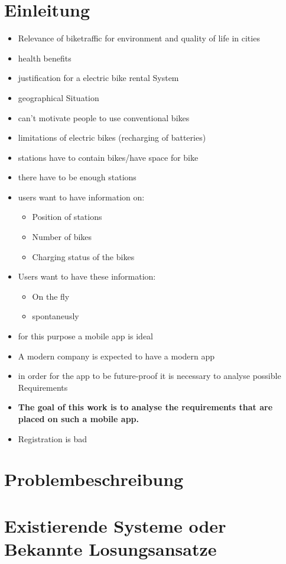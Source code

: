 \documentclass{article}
\begin{document}
\section{Einleitung}
\begin{itemize}
    \item Relevance of biketraffic for environment and quality of life in cities
    \item health benefits
    \item justification for a electric bike rental System
    \item geographical Situation
    \item can't motivate people to use conventional bikes
    \item limitations of electric bikes (recharging of batteries)
    \item stations have to contain bikes/have space for bike
    \item there have to be enough stations
    \item users want to have information on:
    \begin{itemize}
        \item Position of stations
        \item Number of bikes
        \item Charging status of the bikes
    \end{itemize}
    \item Users want to have these information:
    \begin{itemize}
        \item On the fly
        \item spontaneusly
    \end{itemize}
    \item for this purpose a mobile app is ideal
    \item A modern company is expected to have a modern app
    \item in order for the app to be future-proof it is necessary to analyse possible Requirements
    \item \textbf{The goal of this work is to analyse the requirements that are placed on such a mobile app.}
    \item Registration is bad 
\end{itemize}
\section{Problembeschreibung}
\section{Existierende Systeme oder Bekannte Losungsansatze}
\end{document}
